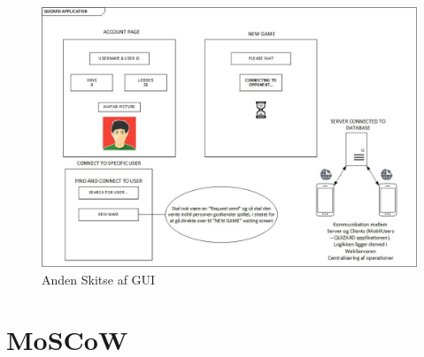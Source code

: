 \documentclass[a4paper,12pt,fleqn,oneside]{article}
\begin{document}
\begin{figure}[H]
    \centering
    \includegraphics[width=\textwidth]{Projektformulering/graphic/2Skitse.jpg}
    \caption{Anden Skitse af GUI}
    \label{fig:2_GUI}
\end{figure}

\section{MoSCoW}
\end{document}
